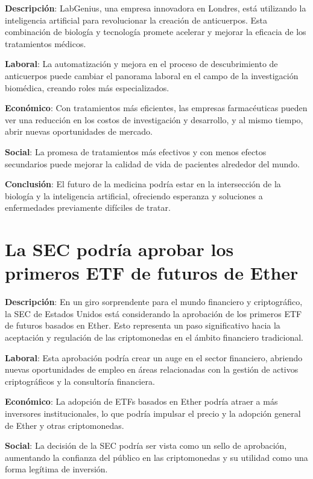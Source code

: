 \documentclass{article}
\begin{document}
\textbf{Descripción}: LabGenius, una empresa innovadora en Londres, está utilizando la inteligencia artificial para revolucionar la creación de anticuerpos. Esta combinación de biología y tecnología promete acelerar y mejorar la eficacia de los tratamientos médicos.

\textbf{Laboral}: La automatización y mejora en el proceso de descubrimiento de anticuerpos puede cambiar el panorama laboral en el campo de la investigación biomédica, creando roles más especializados.

\textbf{Económico}: Con tratamientos más eficientes, las empresas farmacéuticas pueden ver una reducción en los costos de investigación y desarrollo, y al mismo tiempo, abrir nuevas oportunidades de mercado.

\textbf{Social}: La promesa de tratamientos más efectivos y con menos efectos secundarios puede mejorar la calidad de vida de pacientes alrededor del mundo.

\textbf{Conclusión}: El futuro de la medicina podría estar en la intersección de la biología y la inteligencia artificial, ofreciendo esperanza y soluciones a enfermedades previamente difíciles de tratar.

\section*{La SEC podría aprobar los primeros ETF de futuros de Ether}

\textbf{Descripción}: En un giro sorprendente para el mundo financiero y criptográfico, la SEC de Estados Unidos está considerando la aprobación de los primeros ETF de futuros basados en Ether. Esto representa un paso significativo hacia la aceptación y regulación de las criptomonedas en el ámbito financiero tradicional.

\textbf{Laboral}: Esta aprobación podría crear un auge en el sector financiero, abriendo nuevas oportunidades de empleo en áreas relacionadas con la gestión de activos criptográficos y la consultoría financiera.

\textbf{Económico}: La adopción de ETFs basados en Ether podría atraer a más inversores institucionales, lo que podría impulsar el precio y la adopción general de Ether y otras criptomonedas.

\textbf{Social}: La decisión de la SEC podría ser vista como un sello de aprobación, aumentando la confianza del público en las criptomonedas y su utilidad como una forma legítima de inversión.
\end{document}

